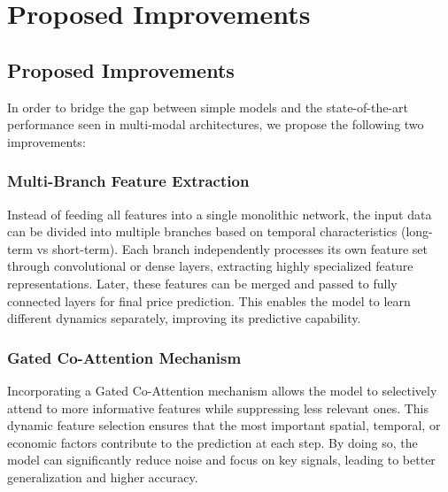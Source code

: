 
\chapter{Proposed Improvements}

\section{Proposed Improvements}

In order to bridge the gap between simple models and the state-of-the-art performance seen in multi-modal architectures, we propose the following two improvements:

\subsection{Multi-Branch Feature Extraction}

Instead of feeding all features into a single monolithic network, the input data can be divided into multiple branches based on temporal characteristics (long-term vs short-term). Each branch independently processes its own feature set through convolutional or dense layers, extracting highly specialized feature representations. Later, these features can be merged and passed to fully connected layers for final price prediction. This enables the model to learn different dynamics separately, improving its predictive capability.

\subsection{Gated Co-Attention Mechanism}

Incorporating a Gated Co-Attention mechanism allows the model to selectively attend to more informative features while suppressing less relevant ones. This dynamic feature selection ensures that the most important spatial, temporal, or economic factors contribute to the prediction at each step. By doing so, the model can significantly reduce noise and focus on key signals, leading to better generalization and higher accuracy.
